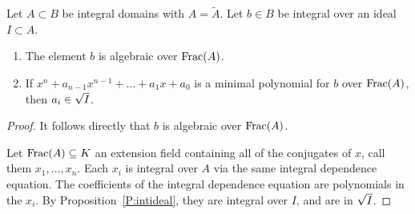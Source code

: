 \documentclass{ximera}
\begin{document}
\begin{proposition}\label{P:intff}
  Let $A\subset B$ be integral domains with $A = \tilde{A}$. Let $b\in
  B$ be integral over an ideal $I\subset A$.
  \begin{enumerate}
  \item The element $b$ is algebraic over $\operatorname{Frac}(A)$.
  \item If $x^n + a_{n-1}x^{n-1} + \dots + a_1 x + a_0$ is a minimal
    polynomial for $b$ over $\operatorname{Frac}(A)$, then $a_i\in \sqrt{I}$.
  \end{enumerate}
  \begin{proof}
    It follows directly that $b$ is algebraic over $\operatorname{Frac}(A)$.

    Let $\operatorname{Frac}(A)\subseteq K$ an extension field containing all of the
    conjugates of $x$, call them $x_1,\dots, x_n$. Each $x_i$ is
    integral over $A$ via the same integral dependence equation. The
    coefficients of the integral dependence equation are polynomials
    in the $x_i$. By Proposition~\ref{P:intideal}, they are integral
    over $I$, and are in $\sqrt{I}$.
  \end{proof}
\end{proposition}
\end{document}
